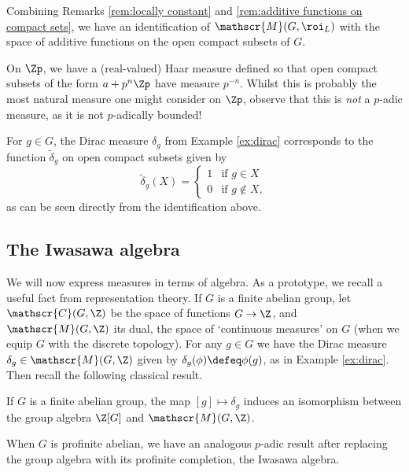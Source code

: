 \documentclass[a4paper,10pt, english, reqno]{smfart}
\newcommand{\sM}{\mathscr{M}}
\newcommand{\sC}{\mathscr{C}}
\numberwithin{equation}{section}
\begin{document}
Combining Remarks \ref{rem:locally constant} and \ref{rem:additive functions on compact sets}, we have an identification of $\sM(G,\roi_L)$ with the space of additive functions on the open compact subsets of $G$.


\begin{remark}
On $\Zp$, we have a (real-valued) Haar measure defined so that open compact subsets of the form $a+p^n\Zp$ have measure $p^{-n}$. Whilst this is probably the most natural measure one might consider on $\Zp$, observe that this is \emph{not} a $p$-adic measure, as it is not $p$-adically bounded!
\end{remark}

\begin{example}
For $g \in G$, the Dirac measure $\delta_g$ from Example \ref{ex:dirac} corresponds to the function $\widetilde{\delta}_g$ on open compact subsets given by
\[
\widetilde{\delta}_g(X) = \left\{\begin{array}{ll} 1 &\text{if } g \in X\\
0 &\text{if } g \notin X,\end{array}\right.
\]
as can be seen directly from the identification above.
\end{example}




\subsection{The Iwasawa algebra} 
We will now express measures in terms of algebra. As a prototype, we recall a useful fact from representation theory. If $G$ is a finite abelian group, let $\sC(G,\Z)$ be the space of functions $G \to \Z$, and $\mathscr{M}(G,\Z)$ its dual, the space of `continuous measures' on $G$ (when we equip $G$ with the discrete topology). For any $g \in G$ we have the Dirac measure $\delta_g \in \mathscr{M}(G,\Z)$ given by $\delta_g(\phi) \defeq \phi(g)$, as in Example \ref{ex:dirac}.  Then recall the following classical result.

\begin{proposition} \label{PropIwGroupAlgebrafinite}
If $G$ is a finite abelian group, the map $[g] \mapsto \delta_g$ induces an isomorphism between the group algebra $\Z[G]$ and $\mathscr{M}(G,\Z)$. 
\end{proposition}

When $G$ is profinite abelian, we have an analogous $p$-adic result after replacing the group  algebra with its profinite completion, the Iwasawa algebra.
\end{document}
